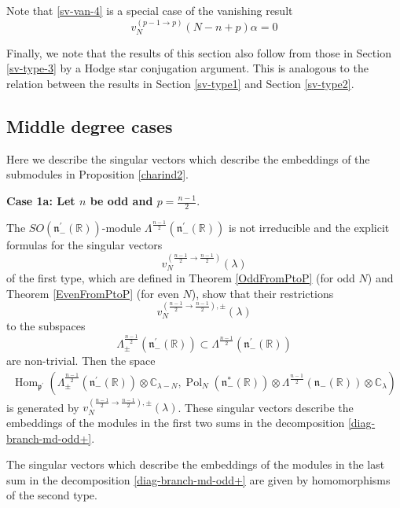 \documentclass[a4paper,12pt,reqno]{amsart}
\numberwithin{theorem}{subsection}
\numberwithin{equation}{section}
\begin{document}
Note that \eqref{sv-van-4} is a special case of the vanishing result
\begin{equation}\label{sv-van-2-general}
   v_N^{(p-1 \to p)}(N\!-\!n\!+\!p) \alpha = 0
\end{equation}

Finally, we note that the results of this section also follow from those in
Section \ref{sv-type-3} by a Hodge star conjugation argument. This is analogous
to the relation between the results in Section \ref{sv-type1} and Section
\ref{sv-type2}.

\subsection{Middle degree cases}\label{fam3}

Here we describe the singular vectors which describe the embeddings of the
submodules in Proposition \ref{charind2}.

{\bf Case 1a: Let $n$ be odd and $p=\frac{n-1}{2}$}.

The $SO({{\mathfrak n}}_-^\prime({\mathbb{R}}))$-module $\Lambda^{\frac{n-1}{2}}({{\mathfrak n}}_-^\prime({\mathbb{R}}))$
is not irreducible and the explicit formulas for the singular vectors
$$
v_N^{(\frac{n-1}{2} \to \frac{n-1}{2})}(\lambda)
$$
of the first type, which are defined in Theorem \ref{OddFromPtoP} (for odd $N$)
and Theorem \ref{EvenFromPtoP} (for even $N$), show that their restrictions
$$
   v_N^{(\frac{n-1}{2} \to \frac{n-1}{2}),\pm}(\lambda)
$$
to the subspaces
$$
   \Lambda^{\frac{n-1}{2}}_\pm({{\mathfrak n}}_-^\prime({\mathbb{R}})) \subset \Lambda^{\frac{n-1}{2}}({{\mathfrak n}}_-^\prime({\mathbb{R}}))
$$
are non-trivial. Then the space
\begin{align*}
   {\operatorname{Hom}}_{{{\mathfrak p}}^\prime}(\Lambda^{\frac{n-1}{2}}_\pm({{\mathfrak n}}_-^\prime({\mathbb{R}})) \otimes {\mathbb{C}}_{\lambda-N},
   {\operatorname{Pol}}_N({{\mathfrak n}}_-^*({\mathbb{R}})) \otimes \Lambda^{\frac{n-1}{2}}({{\mathfrak n}}_-({\mathbb{R}})) \otimes {\mathbb{C}}_\lambda)
\end{align*}
is generated by $v_N^{(\frac{n-1}{2} \to \frac{n-1}{2}),\pm}(\lambda)$. These
singular vectors describe the embeddings of the modules in the first two sums
in the decomposition \eqref{diag-branch-md-odd+}.

The singular vectors which describe the embeddings of the modules in the last
sum in the decomposition \eqref{diag-branch-md-odd+} are given by homomorphisms
of the second type.
\end{document}
